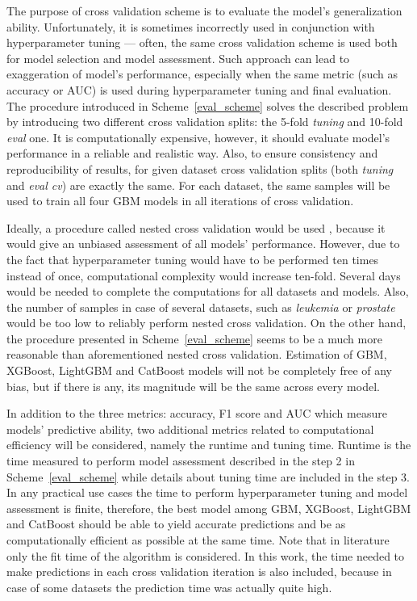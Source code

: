 \documentclass[magisterska, english]{pwr_wmat_praca_dyplomowa}
\theoremstyle{plain}
\numberwithin{theorem}{chapter}
\theoremstyle{definition}
\numberwithin{theorem}{chapter}
\newcommand{\gbm}{GBM, XGBoost, LightGBM and CatBoost }
\begin{document}
The purpose of cross validation scheme is to evaluate the model's generalization ability. Unfortunately, it is sometimes incorrectly used in conjunction with hyperparameter tuning --- often, the same cross validation scheme is used both for model selection and model assessment. Such approach can lead to exaggeration of model's performance, especially when the same metric (such as accuracy or AUC) is used during hyperparameter tuning and final evaluation. The procedure introduced in Scheme~\ref{eval_scheme} solves the described problem by introducing two different cross validation splits: the 5-fold \emph{tuning} and 10-fold \emph{eval} one.
It is computationally expensive, however, it should evaluate model's performance in a reliable and realistic way. Also, to ensure consistency and reproducibility of results, for given dataset cross validation splits (both \emph{tuning} and \emph{eval cv}) are exactly the same. For each dataset, the same samples will be used to train all four GBM models in all iterations of cross validation. 

Ideally, a procedure called nested cross validation would be used \cite{sklearn}, because it would give an unbiased assessment of all models' performance. However, due to the fact that hyperparameter tuning would have to be performed ten times instead of once, computational complexity would increase ten-fold. Several days would be needed to complete the computations for all datasets and models. Also, the number of samples in case of several datasets, such as \emph{leukemia} or \emph{prostate} would be too low to reliably perform nested cross validation. On the other hand, the procedure presented in Scheme~\ref{eval_scheme} seems to be a much more reasonable than aforementioned nested cross validation. Estimation of \gbm models will not be completely free of any bias, but if there is any, its magnitude will be the same across every model. 

In addition to the three metrics: accuracy, F1 score and AUC which measure models' predictive ability, two additional metrics related to computational efficiency will be considered, namely the runtime and tuning time. Runtime is the time measured to perform model assessment described in the step 2 in Scheme~\ref{eval_scheme} while details about tuning time are included in the step 3. In any practical use cases the time to perform hyperparameter tuning and model assessment is finite, therefore, the best model among GBM, XGBoost, LightGBM and CatBoost should be able to yield accurate predictions and be as computationally efficient as possible at the same time. Note that in literature only the fit time of the algorithm is considered. In this work, the time needed to make predictions in each cross validation iteration is also included, because in case of some datasets the prediction time was actually quite high.
\end{document}
